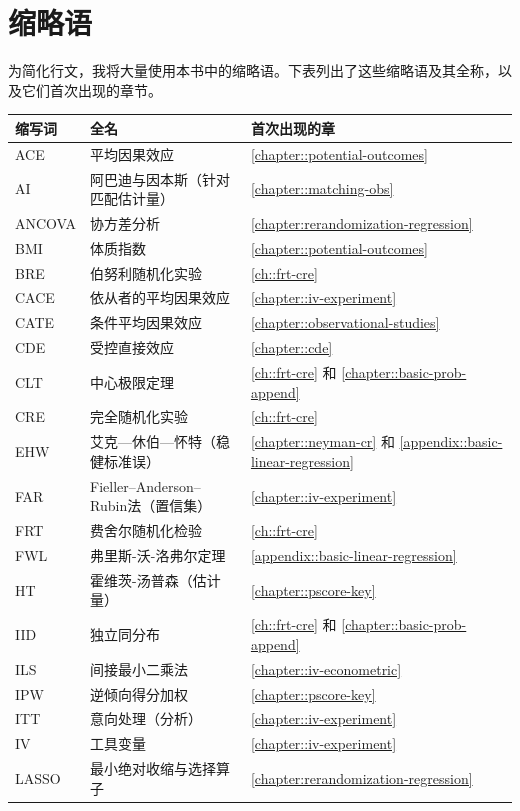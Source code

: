 \chapter*{缩略语}


为简化行文，我将大量使用本书中的缩略语。下表列出了这些缩略语及其全称，以及它们首次出现的章节。

\begin{tabular}{lll}
\hline 
缩写词 & 全名 & 首次出现的章 \\
\hline 
ACE& 平均因果效应&  \ref{chapter::potential-outcomes} \\
AI & 阿巴迪与因本斯（针对匹配估计量） & \ref{chapter::matching-obs} \\
ANCOVA & 协方差分析 & \ref{chapter:rerandomization-regression}\\
BMI & 体质指数 & \ref{chapter::potential-outcomes} \\
BRE & 伯努利随机化实验 & \ref{ch::frt-cre}\\
CACE & 依从者的平均因果效应 & \ref{chapter::iv-experiment} \\
CATE & 条件平均因果效应 & \ref{chapter::observational-studies}\\
CDE & 受控直接效应 & \ref{chapter::cde} \\
CLT & 中心极限定理 & \ref{ch::frt-cre} 和 \ref{chapter::basic-prob-append} \\
CRE & 完全随机化实验 & \ref{ch::frt-cre} \\
EHW& 艾克—休伯—怀特（稳健标准误） & \ref{chapter::neyman-cr} 和 \ref{appendix::basic-linear-regression}\\
FAR & Fieller–Anderson–Rubin法（置信集） & \ref{chapter::iv-experiment}\\
FRT & 费舍尔随机化检验 & \ref{ch::frt-cre} \\
FWL & 弗里斯-沃-洛弗尔定理 & \ref{appendix::basic-linear-regression} \\
HT& 霍维茨-汤普森（估计量） & \ref{chapter::pscore-key}\\
  IID & 独立同分布 &  \ref{ch::frt-cre} 和 \ref{chapter::basic-prob-append} \\
  ILS & 间接最小二乘法 & \ref{chapter::iv-econometric} \\
   IPW& 逆倾向得分加权 & \ref{chapter::pscore-key}\\
ITT & 意向处理（分析） &  \ref{chapter::iv-experiment} \\
 IV & 工具变量 &  \ref{chapter::iv-experiment} \\
 LASSO & 最小绝对收缩与选择算子 & \ref{chapter:rerandomization-regression}\\

\end{tabular}
